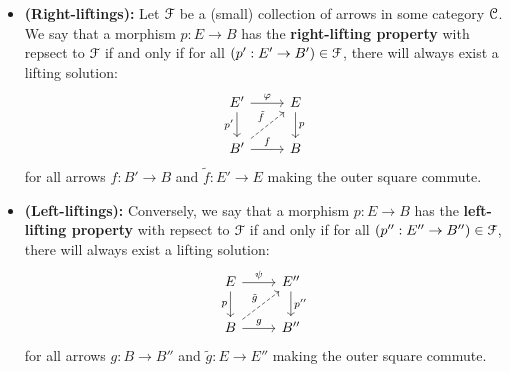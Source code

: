                 \begin{definition} \label{def: lifting_properties}
                    \noindent
                    \begin{itemize}
                        \item \textbf{(Right-liftings):} Let $\mathcal{F}$ be a (small) collection of arrows in some category $\mathcal{C}$. We say that a morphism $p: E \to B$ has the \textbf{right-lifting property} with repsect to $\mathcal{F}$ if and only if for all $(p': E' \to B') \in \mathcal{F}$, there will always exist a lifting solution:
                            $$
                                \begin{tikzcd}
                                	{E'} & E \\
                                	{B'} & B
                                	\arrow["{p'}"', from=1-1, to=2-1]
                                	\arrow["f", from=2-1, to=2-2]
                                	\arrow["p", from=1-2, to=2-2]
                                	\arrow["\varphi", from=1-1, to=1-2]
                                	\arrow["{\tilde{f}}", dashed, from=2-1, to=1-2]
                                \end{tikzcd}
                            $$
                        for all arrows $f: B' \to B$ and $\tilde{f}: E' \to E$ making the outer square commute. 
                        \item \textbf{(Left-liftings):} Conversely, we say that a morphism $p: E \to B$ has the \textbf{left-lifting property} with repsect to $\mathcal{F}$ if and only if for all $(p'': E'' \to B'') \in \mathcal{F}$, there will always exist a lifting solution:
                            $$
                                \begin{tikzcd}
                                	{E} & {E''} \\
                                	{B} & {B''}
                                	\arrow["{p}"', from=1-1, to=2-1]
                                	\arrow["g", from=2-1, to=2-2]
                                	\arrow["{p''}", from=1-2, to=2-2]
                                	\arrow["\psi", from=1-1, to=1-2]
                                	\arrow["{\tilde{g}}", dashed, from=2-1, to=1-2]
                                \end{tikzcd}
                            $$
                        for all arrows $g: B \to B''$ and $\tilde{g}: E \to E''$ making the outer square commute.
                    \end{itemize}
                \end{definition}
